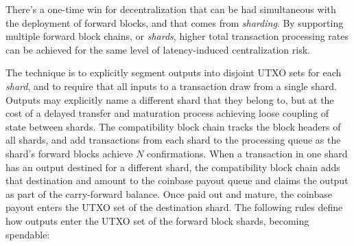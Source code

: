 There's a one-time win for decentralization that can be had
simultaneous with the deployment of forward blocks, and that comes
from \emph{sharding}.  By supporting multiple forward block chains,
or \emph{shards}, higher total transaction processing rates can be
achieved for the same level of latency-induced centralization risk.

The technique is to explicitly segment outputs into disjoint UTXO sets
for each \emph{shard}, and to require that all inputs to a transaction
draw from a single shard.  Outputs may explicitly name a different
shard that they belong to, but at the cost of a delayed transfer and
maturation process achieving loose coupling of state between shards.
The compatibility block chain tracks the block headers of all shards,
and add transactions from each shard to the processing queue as the
shard's forward blocks achieve $N$ confirmations.  When a transaction
in one shard has an output destined for a different shard, the
compatibility block chain adds that destination and amount to the
coinbase payout queue and claims the output as part of the
carry-forward balance.  Once paid out and mature, the coinbase payout
enters the UTXO set of the destination shard.  The following rules
define how outputs enter the UTXO set of the forward block shards,
becoming spendable:

